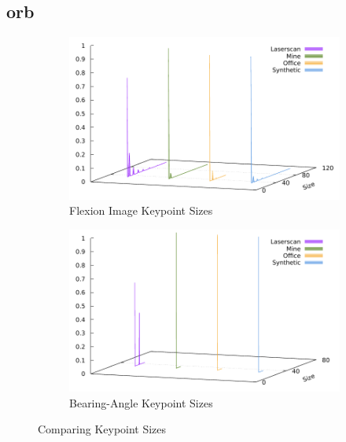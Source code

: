 \subsection{\acrshort{orb}}
\begin{figure}[H]
\begin{subfigure}[t]{0.45\linewidth}
    \includegraphics[width=\linewidth]{chapter06/results/ORB/flexion/size.pdf}%
    \caption{Flexion Image Keypoint Sizes}
\end{subfigure}\quad
\begin{subfigure}[t]{0.45\linewidth}
    \includegraphics[width=\linewidth]{chapter06/results/ORB/bearing/size.pdf}
    \caption{Bearing-Angle Keypoint Sizes}
\end{subfigure}
    \caption{Comparing Keypoint Sizes}
\end{figure}
